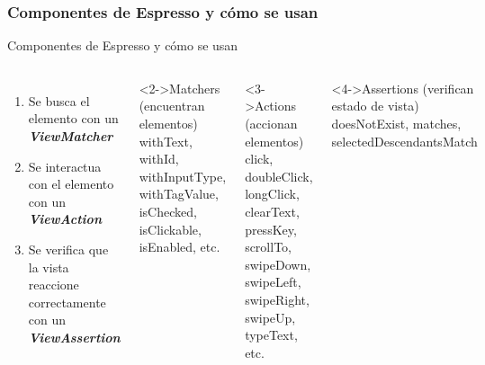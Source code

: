 \documentclass[pdf]
{beamer}
\begin{document}
    \subsubsection{Componentes de Espresso y c\'omo se usan}
    \begin{frame}[t]{Componentes de Espresso y c\'omo se usan}
    
      \begin{columns}
        \begin{enumerate}
         \item Se busca el elemento con un \textbf{\textit{ViewMatcher}}
         \item Se interactua con el elemento con un \textbf{\textit{ViewAction}}
         \item Se verifica que la vista reaccione correctamente con un \textbf{\textit{ViewAssertion}}
        \end{enumerate}
	\begin{block}<2->{Matchers (encuentran elementos)}
	withText, withId, withInputType, withTagValue, isChecked, isClickable, isEnabled, etc.
	\end{block}
	\begin{block}<3->{Actions (accionan elementos)}
	click, doubleClick, longClick, clearText, pressKey, scrollTo, swipeDown, swipeLeft, swipeRight, swipeUp, typeText, etc.
	\end{block}
	\begin{block}<4->{Assertions (verifican estado de vista)}
	doesNotExist, matches, selectedDescendantsMatch
	\end{block}
      \end{columns}
  
    \end{frame}

    
\end{document}
